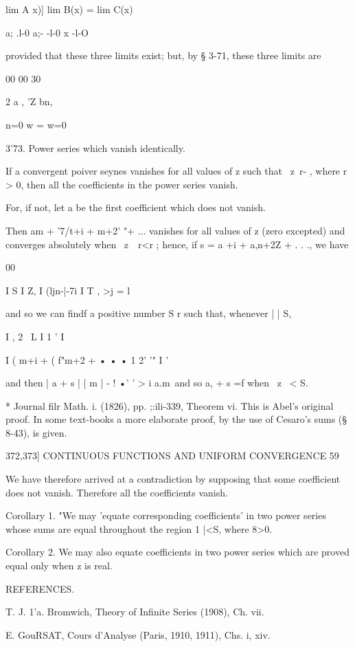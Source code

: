   lim A x)] lim B(x) = lim C(x)\

a; .l-0 a;- -l-0 x -l-O

provided that these three limits exist; but, by § 3-71, these three
limits are

00 00 30

2 a , 'Z bn, %

n=0 w = w=0

3'73. Power series which vanish identically.

If a convergent poiver seynes vanishes for all values of z such that \
z\ r- , where r > 0, then all the coefficients in the power series
vanish.

For, if not, let a be the first coefficient which does not vanish.

Then am + '7/t+i + m+2' "+ ... vanishes for all values of z (zero
excepted) and converges absolutely when \ z\ \ r<r ; hence, if s = a
+i + a,n+2Z + . . ., we have

00

I S I Z, I (ljn-|-7i I T , >j = l

and so we can findf a positive number S r such that, whenever | | S,

I , 2 \ L I 1 ' I

I ( m+i + ( f"m+2 + • • • 1 2' '" I '

and then | a + s | | m | - ! •' ' > i a.m\, and so a, + s =f when \ z
\ < S.

* Journal filr Math. i. (1826), pp. ;:ili-339, Theorem vi. This is
Abel's original proof. In some text-books a more elaborate proof, by
the use of Cesaro's sums (§ 8-43), is given.



372,373] CONTINUOUS FUNCTIONS AND UNIFORM CONVERGENCE 59

We have therefore arrived at a contradiction by supposing that some
coefficient does not vanish. Therefore all the coefficients vanish.

Corollary 1. "We may 'equate corresponding coefficients' in two power
series whose sums are equal throughout the region 1 |<S, where 8>0.

Corollary 2. We may also equate coefficients in two power series which
are proved equal only when z is real.



REFERENCES.

T. J. 1'a. Bromwich, Theory of Infinite Series (1908), Ch. vii.

E. GouRSAT, Cours d'Analyse (Paris, 1910, 1911), Chs. i, xiv.

